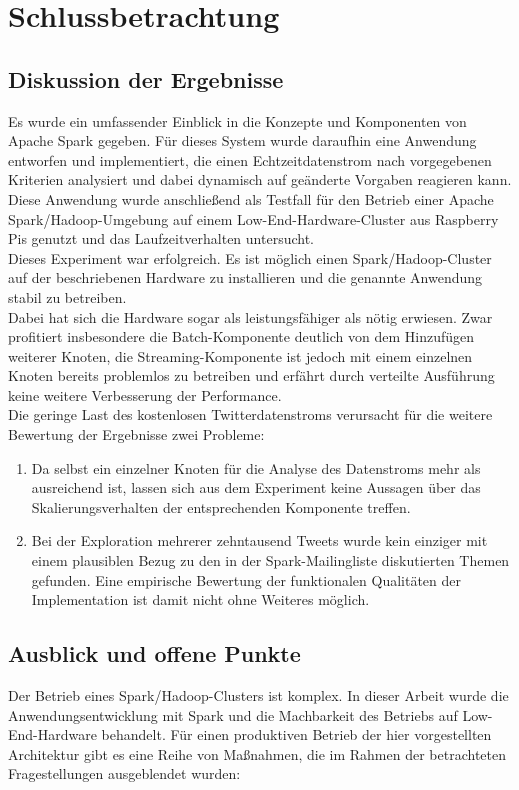 \chapter{Schlussbetrachtung}
\section{Diskussion der Ergebnisse}
Es wurde ein umfassender Einblick in die Konzepte und Komponenten von Apache Spark gegeben. Für dieses System wurde daraufhin eine Anwendung entworfen und implementiert, die einen Echtzeitdatenstrom nach vorgegebenen Kriterien analysiert und dabei dynamisch auf geänderte Vorgaben reagieren kann.\\
Diese Anwendung wurde anschließend als Testfall für den Betrieb einer Apache Spark/Hadoop-Umgebung auf einem Low-End-Hardware-Cluster aus Raspberry Pis genutzt und das Laufzeitverhalten untersucht.\\

Dieses Experiment war erfolgreich. Es ist möglich einen Spark/Hadoop-Cluster auf der beschriebenen Hardware zu installieren und die genannte Anwendung stabil zu betreiben.\\

Dabei hat sich die Hardware sogar als leistungsfähiger als nötig erwiesen. Zwar profitiert insbesondere die Batch-Komponente deutlich von dem Hinzufügen weiterer Knoten, die Streaming-Komponente ist jedoch mit einem einzelnen Knoten bereits problemlos zu betreiben und erfährt durch verteilte Ausführung keine weitere Verbesserung der Performance.\\

Die geringe Last des kostenlosen Twitterdatenstroms verursacht für die weitere Bewertung der Ergebnisse zwei Probleme:
\begin{enumerate}
	\item Da selbst ein einzelner Knoten für die Analyse des Datenstroms mehr als ausreichend ist, lassen sich aus dem Experiment keine Aussagen über das Skalierungsverhalten der entsprechenden Komponente treffen.
	\item Bei der Exploration mehrerer zehntausend Tweets wurde kein einziger mit einem plausiblen Bezug zu den in der Spark-Mailingliste diskutierten Themen gefunden. Eine empirische Bewertung der funktionalen Qualitäten der Implementation ist damit nicht ohne Weiteres möglich.
\end{enumerate}

\section{Ausblick und offene Punkte}
Der Betrieb eines Spark/Hadoop-Clusters ist komplex. In dieser Arbeit wurde die Anwendungsentwicklung mit Spark und die Machbarkeit des Betriebs auf Low-End-Hardware behandelt. Für einen produktiven Betrieb der hier vorgestellten Architektur gibt es eine Reihe von Maßnahmen, die im Rahmen der betrachteten Fragestellungen ausgeblendet wurden:\\

